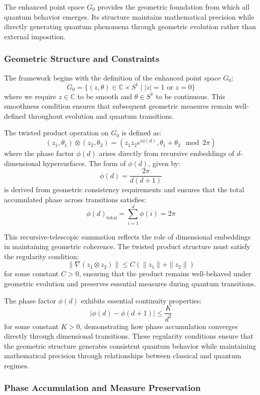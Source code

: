 \documentclass[10pt]{article}
\begin{document}
The enhanced point space $G_0$ provides the geometric foundation from which all quantum behavior emerges. Its structure maintains mathematical precision while directly generating quantum phenomena through geometric evolution rather than external imposition.

\subsubsection{Geometric Structure and Constraints}

The framework begins with the definition of the enhanced point space $G_0$:
\[
G_0 = \{(z, \theta) \in \mathbb{C} \times S^1 \mid |z| = 1 \text{ or } z = 0\}
\]
where we require $z \in \mathbb{C}$ to be smooth and $\theta \in S^1$ to be continuous. This smoothness condition ensures that subsequent geometric measures remain well-defined throughout evolution and quantum transitions.

The twisted product operation on $G_0$ is defined as:
\[
(z_1, \theta_1) \otimes (z_2, \theta_2) = \left(z_1 z_2 e^{i\phi(d)}, \theta_1 + \theta_2 \mod 2\pi\right)
\]
where the phase factor $\phi(d)$ arises directly from recursive embeddings of $d$-dimensional hypersurfaces. The form of $\phi(d)$, given by:
\[
\phi(d) = \frac{2\pi}{d(d+1)}
\]
is derived from geometric consistency requirements and ensures that the total accumulated phase across transitions satisfies:
\[
\phi(d)_{\text{total}} = \sum_{i=1}^d \phi(i) = 2\pi
\]

This recursive-telescopic summation reflects the role of dimensional embeddings in maintaining geometric coherence. The twisted product structure must satisfy the regularity condition:
\[
\|\nabla(z_1 \otimes z_2)\| \leq C(\|z_1\| + \|z_2\|)
\]
for some constant $C > 0$, ensuring that the product remains well-behaved under geometric evolution and preserves essential measures during quantum transitions.

The phase factor $\phi(d)$ exhibits essential continuity properties:
\[
|\phi(d) - \phi(d+1)| \leq \frac{K}{d^2}
\]
for some constant $K > 0$, demonstrating how phase accumulation converges directly through dimensional transitions. These regularity conditions ensure that the geometric structure generates consistent quantum behavior while maintaining mathematical precision through relationships between classical and quantum regimes.

\subsubsection{Phase Accumulation and Measure Preservation}
\end{document}
